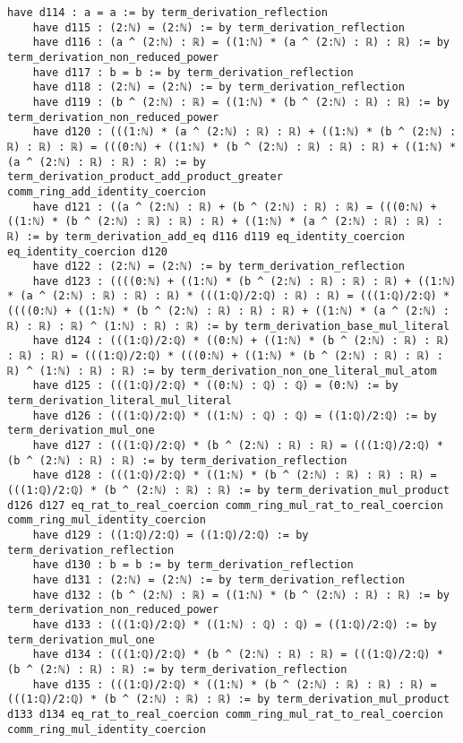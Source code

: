 \documentclass{article}
\begin{document}
\begin{tcolorbox}[colback=white!10, width=\linewidth]
\begin{lstlisting}[language=Lean4]
    have d114 : a = a := by term_derivation_reflection
    have d115 : (2:ℕ) = (2:ℕ) := by term_derivation_reflection
    have d116 : (a ^ (2:ℕ) : ℝ) = ((1:ℕ) * (a ^ (2:ℕ) : ℝ) : ℝ) := by term_derivation_non_reduced_power
    have d117 : b = b := by term_derivation_reflection
    have d118 : (2:ℕ) = (2:ℕ) := by term_derivation_reflection
    have d119 : (b ^ (2:ℕ) : ℝ) = ((1:ℕ) * (b ^ (2:ℕ) : ℝ) : ℝ) := by term_derivation_non_reduced_power
    have d120 : (((1:ℕ) * (a ^ (2:ℕ) : ℝ) : ℝ) + ((1:ℕ) * (b ^ (2:ℕ) : ℝ) : ℝ) : ℝ) = (((0:ℕ) + ((1:ℕ) * (b ^ (2:ℕ) : ℝ) : ℝ) : ℝ) + ((1:ℕ) * (a ^ (2:ℕ) : ℝ) : ℝ) : ℝ) := by term_derivation_product_add_product_greater comm_ring_add_identity_coercion
    have d121 : ((a ^ (2:ℕ) : ℝ) + (b ^ (2:ℕ) : ℝ) : ℝ) = (((0:ℕ) + ((1:ℕ) * (b ^ (2:ℕ) : ℝ) : ℝ) : ℝ) + ((1:ℕ) * (a ^ (2:ℕ) : ℝ) : ℝ) : ℝ) := by term_derivation_add_eq d116 d119 eq_identity_coercion eq_identity_coercion d120
    have d122 : (2:ℕ) = (2:ℕ) := by term_derivation_reflection
    have d123 : ((((0:ℕ) + ((1:ℕ) * (b ^ (2:ℕ) : ℝ) : ℝ) : ℝ) + ((1:ℕ) * (a ^ (2:ℕ) : ℝ) : ℝ) : ℝ) * (((1:ℚ)/2:ℚ) : ℝ) : ℝ) = (((1:ℚ)/2:ℚ) * ((((0:ℕ) + ((1:ℕ) * (b ^ (2:ℕ) : ℝ) : ℝ) : ℝ) + ((1:ℕ) * (a ^ (2:ℕ) : ℝ) : ℝ) : ℝ) ^ (1:ℕ) : ℝ) : ℝ) := by term_derivation_base_mul_literal
    have d124 : (((1:ℚ)/2:ℚ) * ((0:ℕ) + ((1:ℕ) * (b ^ (2:ℕ) : ℝ) : ℝ) : ℝ) : ℝ) = (((1:ℚ)/2:ℚ) * (((0:ℕ) + ((1:ℕ) * (b ^ (2:ℕ) : ℝ) : ℝ) : ℝ) ^ (1:ℕ) : ℝ) : ℝ) := by term_derivation_non_one_literal_mul_atom
    have d125 : (((1:ℚ)/2:ℚ) * ((0:ℕ) : ℚ) : ℚ) = (0:ℕ) := by term_derivation_literal_mul_literal
    have d126 : (((1:ℚ)/2:ℚ) * ((1:ℕ) : ℚ) : ℚ) = ((1:ℚ)/2:ℚ) := by term_derivation_mul_one
    have d127 : (((1:ℚ)/2:ℚ) * (b ^ (2:ℕ) : ℝ) : ℝ) = (((1:ℚ)/2:ℚ) * (b ^ (2:ℕ) : ℝ) : ℝ) := by term_derivation_reflection
    have d128 : (((1:ℚ)/2:ℚ) * ((1:ℕ) * (b ^ (2:ℕ) : ℝ) : ℝ) : ℝ) = (((1:ℚ)/2:ℚ) * (b ^ (2:ℕ) : ℝ) : ℝ) := by term_derivation_mul_product d126 d127 eq_rat_to_real_coercion comm_ring_mul_rat_to_real_coercion comm_ring_mul_identity_coercion
    have d129 : ((1:ℚ)/2:ℚ) = ((1:ℚ)/2:ℚ) := by term_derivation_reflection
    have d130 : b = b := by term_derivation_reflection
    have d131 : (2:ℕ) = (2:ℕ) := by term_derivation_reflection
    have d132 : (b ^ (2:ℕ) : ℝ) = ((1:ℕ) * (b ^ (2:ℕ) : ℝ) : ℝ) := by term_derivation_non_reduced_power
    have d133 : (((1:ℚ)/2:ℚ) * ((1:ℕ) : ℚ) : ℚ) = ((1:ℚ)/2:ℚ) := by term_derivation_mul_one
    have d134 : (((1:ℚ)/2:ℚ) * (b ^ (2:ℕ) : ℝ) : ℝ) = (((1:ℚ)/2:ℚ) * (b ^ (2:ℕ) : ℝ) : ℝ) := by term_derivation_reflection
    have d135 : (((1:ℚ)/2:ℚ) * ((1:ℕ) * (b ^ (2:ℕ) : ℝ) : ℝ) : ℝ) = (((1:ℚ)/2:ℚ) * (b ^ (2:ℕ) : ℝ) : ℝ) := by term_derivation_mul_product d133 d134 eq_rat_to_real_coercion comm_ring_mul_rat_to_real_coercion comm_ring_mul_identity_coercion

\end{lstlisting}
\end{tcolorbox}
\end{document}
